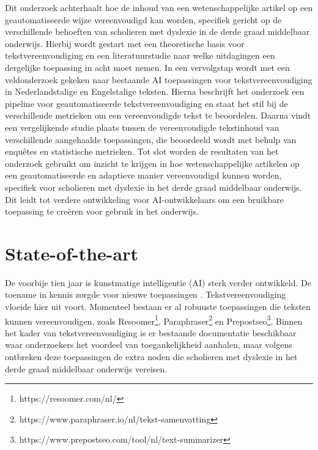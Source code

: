 Dit onderzoek achterhaalt hoe de inhoud van een wetenschappelijke artikel op een geautomatiseerde wijze vereenvoudigd kan worden, specifiek gericht op de verschillende behoeften van scholieren met dyslexie in de derde graad middelbaar onderwijs. Hierbij wordt gestart met een theoretische basis voor tekstvereenvoudiging en een literatuurstudie naar welke uitdagingen een dergelijke toepassing in acht moet nemen. In een vervolgstap wordt met een veldonderzoek gekeken naar bestaande AI toepassingen voor tekstvereenvoudiging in Nederlandstalige en Engelstalige teksten. Hierna beschrijft het onderzoek een pipeline voor geautomatiseerde tekstvereenvoudiging en staat het stil bij de verschillende metrieken om een vereenvoudigde tekst te beoordelen. Daarna vindt een vergelijkende studie plaats tussen de vereenvoudigde tekstinhoud van verschillende aangehaalde toepassingen, die beoordeeld wordt met behulp van enquêtes en statistische metrieken. Tot slot worden de resultaten van het onderzoek gebruikt om inzicht te krijgen in hoe wetenschappelijke artikelen op een geautomatiseerde en adaptieve manier vereenvoudigd kunnen worden, specifiek voor scholieren met dyslexie in het derde graad middelbaar onderwijs. Dit leidt tot verdere ontwikkeling voor AI-ontwikkelaars om een bruikbare toepassing te creëren voor gebruik in het onderwijs.




\section{State-of-the-art}%
\label{sec:state-of-the-art}

De voorbije tien jaar is kunstmatige intelligentie (AI) sterk verder ontwikkeld. De toename in kennis zorgde voor nieuwe toepassingen \autocite{Vasista2022}. Tekstvereenvoudiging vloeide hier uit voort. Momenteel bestaan er al robuuste toepassingen die teksten kunnen vereenvoudigen, zoals Resoomer\footnote{https://resoomer.com/nl/}, Paraphraser\footnote{https://www.paraphraser.io/nl/tekst-samenvatting} en Prepostseo\footnote{https://www.prepostseo.com/tool/nl/text-summarizer}. Binnen het kader van tekstvereenvoudiging is er bestaande documentatie beschikbaar waar onderzoekers het voordeel van toegankelijkheid aanhalen, maar volgens \textcite{Gooding2022} ontbreken deze toepassingen de extra noden die scholieren met dyslexie in het derde graad middelbaar onderwijs vereisen.

